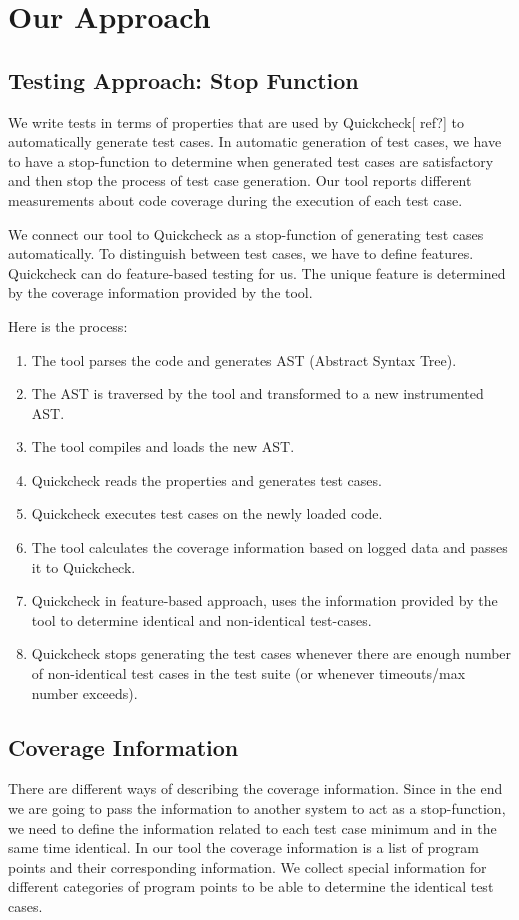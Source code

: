 \documentclass[12pt,a4paper]{report}
\begin{document}
\chapter{Our Approach}
\newpage
\section{Testing Approach: Stop Function}
We write tests in terms of properties that are used by Quickcheck[ ref?] to automatically generate test cases. In automatic generation of test cases, we
 have to have a stop-function to determine when generated test cases are satisfactory and then stop the process of test case generation. Our tool reports
 different measurements about code coverage during the execution of each test case. 

We connect our tool to Quickcheck as a stop-function of generating test cases automatically. To distinguish between test cases, we have to define features.
 Quickcheck can do feature-based testing for us. The unique feature is determined by the coverage information provided by the tool.

Here is the process:
\begin{enumerate}
 \item The tool parses the code and generates AST (Abstract Syntax Tree).
 \item The AST is traversed by the tool and transformed to a new instrumented AST.
 \item The tool compiles and loads the new AST.
 \item Quickcheck reads the properties and generates test cases.
 \item Quickcheck executes test cases on the newly loaded code.
 \item The tool calculates the coverage information based on logged data and passes it to Quickcheck.
 \item Quickcheck in feature-based approach, uses the information provided by the tool to determine identical and non-identical test-cases.
 \item Quickcheck stops generating the test cases whenever there are enough number of non-identical test cases in the test suite (or 
whenever timeouts/max number exceeds).
\end{enumerate}

\section{Coverage Information}
There are different ways of describing the coverage information. Since in the end we are going to pass the information to another system to act as a stop-function, we need to
 define the information related to each test case minimum and in the same time identical. In our tool the coverage information is a list of program points and their
 corresponding information. We collect special information for different categories of program points to be able to determine the identical test cases.
\end{document}

